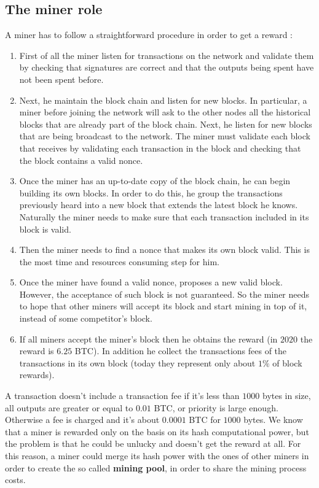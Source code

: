 \subsection{The miner role}
A miner has to follow a straightforward procedure in order to get a reward :
\begin{enumerate}
\item First of all the miner listen for transactions on the network and validate them by checking that signatures are correct and that the outputs being spent have not been spent before.
\item Next, he maintain the block chain and listen for new blocks. In particular, a miner before joining the network will ask to the other nodes all the historical blocks that are already part of the block chain. Next, he listen for new blocks that are being broadcast to the network. The miner must validate each block that receives by validating each transaction in the block and checking that the block contains a valid nonce.
\item Once the miner has an up-to-date copy of the block chain, he can begin building its own blocks. In order to do this, he group the transactions previously heard into a new block that extends the latest block he knows. Naturally the miner needs to make sure that each transaction included in its block is valid.
\item Then the miner needs to find a nonce that makes its own block valid. This is the most time and resources consuming step for him.
\item Once the miner have found a valid nonce, proposes a new valid block. However, the acceptance of such block is not guaranteed. So the miner needs to hope that other miners will accept its block and start mining in top of it, instead of some competitor's block.
\item If all miners accept the miner's block then he obtains the reward (in $2020$ the reward is $6.25$ BTC). In addition he collect the transactions fees of the transactions in its own block (today they represent only about $1 \%$ of block rewards).
\end{enumerate}
A transaction doesn't include a transaction fee if it's less than $1000$ bytes in size, all outputs are greater or equal to $0.01$ BTC, or priority is large enough. Otherwise a fee is charged and it's about $0.0001$ BTC for $1000$ bytes. We know that a miner is rewarded only on the basis on its hash computational power, but the problem is that he could be unlucky and doesn't get the reward at all. For this reason, a miner could merge its hash power with the ones of other miners in order to create the so called \textbf{mining pool}, in order to share the mining process costs.

